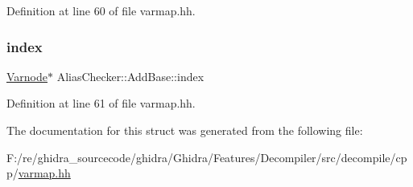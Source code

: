 Definition at line 60 of file varmap.\+hh.

\mbox{\label{struct_alias_checker_1_1_add_base_a57cd96c1c53a0fe5a8578d330d7ba146}} 
\subsubsection{\texorpdfstring{index}{index}}
{\footnotesize\ttfamily \mbox{\hyperlink{class_varnode}{Varnode}}$\ast$ Alias\+Checker\+::\+Add\+Base\+::index}



Definition at line 61 of file varmap.\+hh.



The documentation for this struct was generated from the following file\+:\begin{DoxyCompactItemize}
\item 
F\+:/re/ghidra\+\_\+sourcecode/ghidra/\+Ghidra/\+Features/\+Decompiler/src/decompile/cpp/\mbox{\hyperlink{varmap_8hh}{varmap.\+hh}}\end{DoxyCompactItemize}
